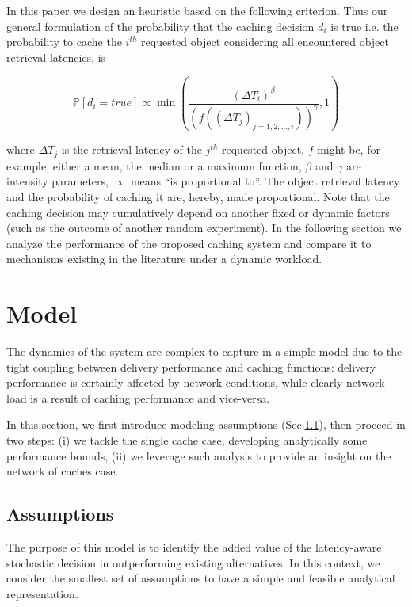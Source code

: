 \documentclass[conference]{IEEEtran}
\begin{document}
In this paper we design an heuristic based on the following 
criterion. Thus our general formulation of the probability 
that the caching decision $d_i$ is true i.e. the probability 
to cache the $i^{th}$ requested object considering all encountered object retrieval latencies, is

\begin{equation}
\mathbb{P} \left[ d_i = true \right] \propto \min{\left(\frac{\left( \Delta T_i \right)^\beta }{\left( f\left((\Delta T_j)_{j = 1,2,\dots,i}\right) \right)^\gamma }, 1\right)} 
\end{equation}

where  $\Delta T_j$ is the retrieval latency of the $j^{th}$ 
requested object, $f$ might be, for example, either a mean, 
the median or a maximum function, $\beta$ and $\gamma$ are 
intensity parameters, $\propto$ means  ``is proportional 
to''. The object retrieval latency and the probability of 
caching it are, hereby, made proportional.  Note that the 
caching decision may cumulatively depend on another fixed or 
dynamic factors (such as the outcome of another random 
experiment).
In the following section we analyze the performance of the 
proposed caching system and compare it to mechanisms existing 
in the literature under a dynamic workload.

\section{Model}
\label{sec:system_model}
The dynamics of the system are complex to capture in a simple 
model due to the tight coupling between delivery performance 
and caching functions: delivery performance is certainly 
affected by network conditions, while clearly network load is 
a result of caching performance and vice-versa. 

In this section, we first introduce modeling assumptions 
(Sec.\ref{sec:ass}), then proceed in two steps: (i) we tackle 
the single cache case, developing analytically some performance bounds, (ii) we leverage such analysis to 
provide an insight on the network of caches case.

\subsection{Assumptions}\label{sec:ass}
The purpose of this model is to identify the added value of the latency-aware stochastic 
decision in outperforming existing alternatives.
In this context, we consider the smallest set of assumptions to have a simple and feasible 
analytical representation.
\end{document}
